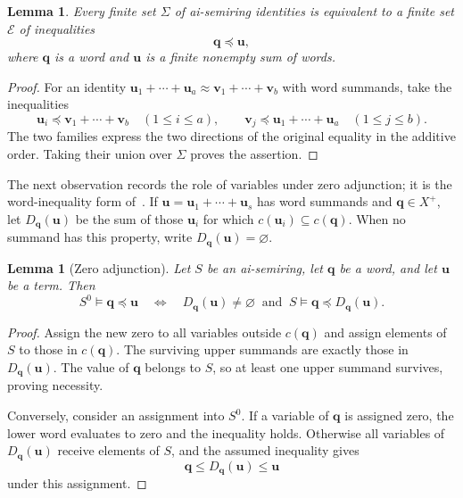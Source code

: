 \documentclass[10pt,a4paper]{amsart}
\newtheorem{lemma}[theorem]{Lemma}
\numberwithin{equation}{section}
\newcommand{\bu}{\mathbf{u}}
\newcommand{\bv}{\mathbf{v}}
\newcommand{\bq}{\mathbf{q}}
\newcommand{\calE}{\mathcal{E}}
\renewcommand{\leq}{\leqslant}
\begin{document}
\begin{lemma}\label{lem:reduction}
Every finite set $\Sigma$ of ai-semiring identities is equivalent to a finite set $\calE$ of inequalities
\[
 \bq\preceq\bu,
\]
where $\bq$ is a word and $\bu$ is a finite nonempty sum of words.
\end{lemma}
\begin{proof}
For an identity $\bu_1+\cdots+\bu_a\approx\bv_1+\cdots+\bv_b$ with word summands, take the inequalities
\[
 \bu_i\preceq\bv_1+\cdots+\bv_b\quad(1\leq i\leq a),
 \qquad
 \bv_j\preceq\bu_1+\cdots+\bu_a\quad(1\leq j\leq b).
\]
The two families express the two directions of the original equality in the additive order. Taking their union over $\Sigma$ proves the assertion.
\end{proof}

The next observation records the role of variables under zero adjunction; it is the word-inequality form of~\cite[Proposition~1.5]{wrz}. If $\bu=\bu_1+\cdots+\bu_s$ has word summands and $\bq\in X^+$, let $D_{\bq}(\bu)$ be the sum of those $\bu_i$ for which $c(\bu_i)\subseteq c(\bq)$. When no summand has this property, write $D_{\bq}(\bu)=\varnothing$.

\begin{lemma}[Zero adjunction]\label{lem:zeroidentity}
Let $S$ be an ai-semiring, let $\bq$ be a word, and let $\bu$ be a term. Then
\[
 S^0\models\bq\preceq\bu
 \quad\Longleftrightarrow\quad
 D_{\bq}(\bu)\ne\varnothing
 \ \text{ and }\ S\models\bq\preceq D_{\bq}(\bu).
\]
\end{lemma}
\begin{proof}
Assign the new zero to all variables outside $c(\bq)$ and assign elements of $S$ to those in $c(\bq)$. The surviving upper summands are exactly those in $D_{\bq}(\bu)$. The value of $\bq$ belongs to $S$, so at least one upper summand survives, proving necessity.

Conversely, consider an assignment into $S^0$. If a variable of $\bq$ is assigned zero, the lower word evaluates to zero and the inequality holds. Otherwise all variables of $D_{\bq}(\bu)$ receive elements of $S$, and the assumed inequality gives
\[
 \bq\leq D_{\bq}(\bu)\leq\bu
\]
under this assignment.
\end{proof}
\end{document}
